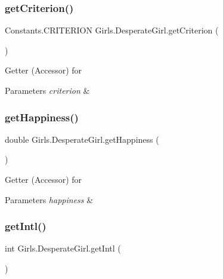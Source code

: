 \subsubsection{\texorpdfstring{get\+Criterion()}{getCriterion()}}
{\footnotesize\ttfamily Constants.\+C\+R\+I\+T\+E\+R\+I\+ON Girls.\+Desperate\+Girl.\+get\+Criterion (\begin{DoxyParamCaption}{ }\end{DoxyParamCaption})\hspace{0.3cm}{\ttfamily [inline]}}

Getter (Accessor) for 
\begin{DoxyParams}{Parameters}
{\em criterion} & \\
\hline
\end{DoxyParams}
\mbox{\label{class_girls_1_1_desperate_girl_aabbb3994973c9209f21b8303e9031d4b}} 
\subsubsection{\texorpdfstring{get\+Happiness()}{getHappiness()}}
{\footnotesize\ttfamily double Girls.\+Desperate\+Girl.\+get\+Happiness (\begin{DoxyParamCaption}{ }\end{DoxyParamCaption})\hspace{0.3cm}{\ttfamily [inline]}}

Getter (Accessor) for 
\begin{DoxyParams}{Parameters}
{\em happiness} & \\
\hline
\end{DoxyParams}
\mbox{\label{class_girls_1_1_desperate_girl_ab752558cdcede9ff40a529a0a35a1073}} 
\subsubsection{\texorpdfstring{get\+Intl()}{getIntl()}}
{\footnotesize\ttfamily int Girls.\+Desperate\+Girl.\+get\+Intl (\begin{DoxyParamCaption}{ }\end{DoxyParamCaption})\hspace{0.3cm}{\ttfamily [inline]}}

